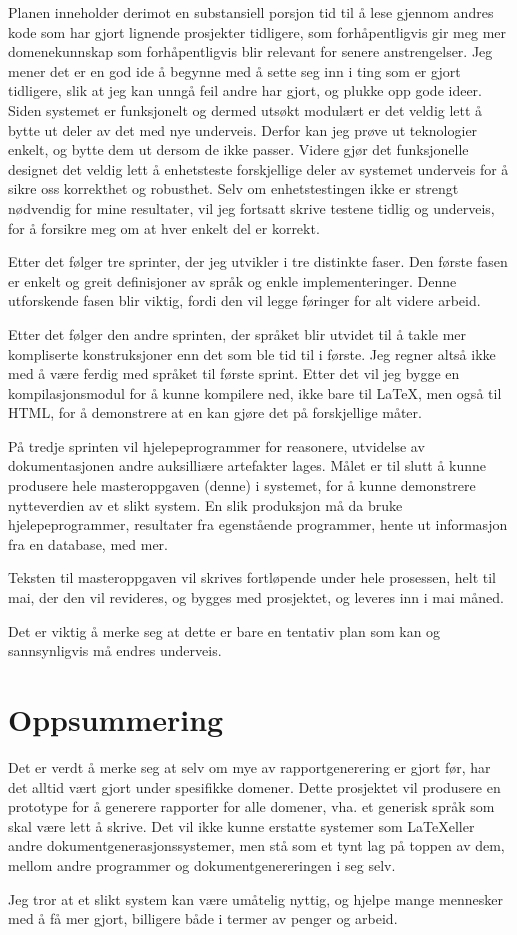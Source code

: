 \documentclass[11pt]{article}
\begin{document}
Planen inneholder derimot en substansiell porsjon tid til å lese gjennom andres kode som har gjort lignende prosjekter tidligere, som forhåpentligvis gir meg mer domenekunnskap som forhåpentligvis blir relevant for senere anstrengelser.
Jeg mener det er en god ide å begynne med å sette seg inn i ting som er gjort tidligere, slik at jeg kan unngå feil andre har gjort, og plukke opp gode ideer.
Siden systemet er funksjonelt og dermed utsøkt modulært er det veldig lett å bytte ut deler av det med nye underveis. Derfor kan jeg prøve ut teknologier enkelt, og bytte dem ut dersom de ikke passer.
Videre gjør det funksjonelle designet det veldig lett å enhetsteste forskjellige deler av systemet underveis for å sikre oss korrekthet og robusthet.
Selv om enhetstestingen ikke er strengt nødvendig for mine resultater, vil jeg fortsatt skrive testene tidlig og underveis, for å forsikre meg om at hver enkelt del er korrekt.

Etter det følger tre sprinter, der jeg utvikler i tre distinkte faser.
Den første fasen er enkelt og greit definisjoner av språk og enkle implementeringer. Denne utforskende fasen blir viktig, fordi den vil legge føringer for alt videre arbeid.

Etter det følger den andre sprinten, der språket blir utvidet til å takle mer kompliserte konstruksjoner enn det som ble tid til i første.
Jeg regner altså ikke med å være ferdig med språket til første sprint. Etter det vil jeg bygge en kompilasjonsmodul for å kunne kompilere ned, ikke bare til \LaTeX, men også til HTML, for å demonstrere at en kan gjøre det på forskjellige måter.

På tredje sprinten vil hjelepeprogrammer for reasonere, utvidelse av dokumentasjonen andre auksilliære artefakter lages. Målet er til slutt å kunne produsere hele masteroppgaven (denne) i systemet, for å kunne demonstrere nytteverdien av et slikt system.
En slik produksjon må da bruke hjelepeprogrammer, resultater fra egenstående programmer, hente ut informasjon fra en database, med mer.

Teksten til masteroppgaven vil skrives fortløpende under hele prosessen, helt til mai, der den vil revideres, og bygges med prosjektet, og leveres inn i mai måned.

Det er viktig å merke seg at dette er bare en tentativ plan som kan og sannsynligvis må endres underveis.


\section{Oppsummering}
Det er verdt å merke seg at selv om mye av rapportgenerering er gjort før, har det alltid vært gjort under spesifikke domener. Dette prosjektet vil produsere en prototype for å generere rapporter for alle domener, vha. et generisk språk som skal være lett å skrive.
Det vil ikke kunne erstatte systemer som \LaTeX eller andre dokumentgenerasjonssystemer, men stå som et tynt lag på toppen av dem, mellom andre programmer og dokumentgenereringen i seg selv.

Jeg tror at et slikt system kan være umåtelig nyttig, og hjelpe mange mennesker med å få mer gjort, billigere både i termer av penger og arbeid.

{}    

\end{document}
